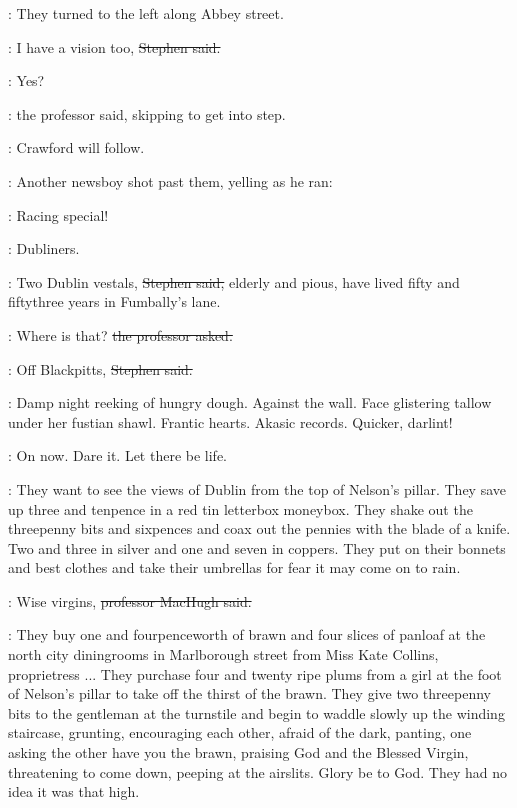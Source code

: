 :
They turned to the left along Abbey street.

\Stephen:
I have a vision too,
\sout{Stephen said.}

\machugh:
Yes?

:
the professor said,
skipping to get into step.

\machugh:
Crawford will follow.

:
Another newsboy shot past them,
yelling as he ran:

\boy:
Racing special!



\StephenInt:
Dubliners.

\Stephen:
Two Dublin vestals,
\sout{Stephen said,}
elderly and pious,
have lived fifty and fiftythree years in Fumbally's lane.

\machugh:
Where is that?
\sout{the professor asked.}

\Stephen:
Off Blackpitts,
\sout{Stephen said.}

\StephenInt:
Damp night reeking of hungry dough.
Against the wall.
Face glistering tallow under her fustian shawl.
Frantic hearts.
Akasic records.
Quicker, darlint!

\StephenInt:
On now.
Dare it.
Let there be life.

\Stephen:
They want to see the views of Dublin from the top of Nelson's pillar.
They save up three and tenpence in a red tin letterbox moneybox.
They shake out the threepenny bits and sixpences
and coax out the pennies with the blade of a knife.
Two and three in silver
and one and seven in coppers.
They put on their bonnets and best clothes
and take their umbrellas for fear it may come on to rain.

\machugh:
Wise virgins,
\sout{professor MacHugh said.}



\Stephen:
They buy one and fourpenceworth of brawn
and four slices of panloaf
at the north city diningrooms in Marlborough street
from Miss Kate Collins, proprietress ...
They purchase four and twenty ripe plums
from a girl at the foot of Nelson's pillar
to take off the thirst of the brawn.
They give two threepenny bits to the gentleman at the turnstile
and begin to waddle slowly up the winding staircase,
grunting,
encouraging each other,
afraid of the dark,
panting,
one asking the other
have you the brawn,
praising
God and the Blessed Virgin,
threatening to come down,
peeping at the airslits.
Glory be to God.
They had no idea it was that high.

